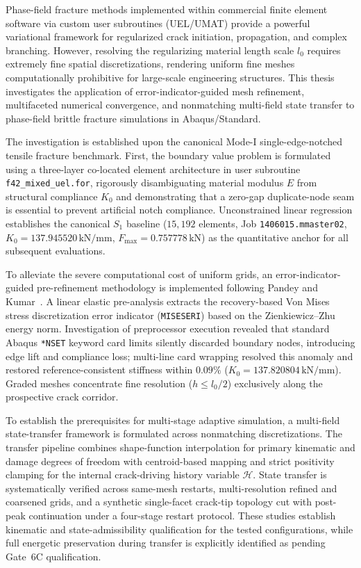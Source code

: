 Phase-field fracture methods implemented within commercial finite element software via custom user subroutines (UEL/UMAT) provide a powerful variational framework for regularized crack initiation, propagation, and complex branching. However, resolving the regularizing material length scale $l_0$ requires extremely fine spatial discretizations, rendering uniform fine meshes computationally prohibitive for large-scale engineering structures. This thesis investigates the application of error-indicator-guided mesh refinement, multifaceted numerical convergence, and nonmatching multi-field state transfer to phase-field brittle fracture simulations in Abaqus/Standard.

The investigation is established upon the canonical Mode-I single-edge-notched tensile fracture benchmark. First, the boundary value problem is formulated using a three-layer co-located element architecture in user subroutine \nolinkurl{f42_mixed_uel.for}, rigorously disambiguating material modulus $E$ from structural compliance $K_0$ and demonstrating that a zero-gap duplicate-node seam is essential to prevent artificial notch compliance. Unconstrained linear regression establishes the canonical $S_1$ baseline ($15{,}192$ elements, Job \texttt{1406015.mmaster02}, $K_0 = 137.945520\,\text{kN/mm}$, $F_{\max} = 0.757778\,\text{kN}$) as the quantitative anchor for all subsequent evaluations.

To alleviate the severe computational cost of uniform grids, an error-indicator-guided pre-refinement methodology is implemented following Pandey and Kumar~\cite{pandey2025}. A linear elastic pre-analysis extracts the recovery-based Von Mises stress discretization error indicator (\texttt{MISESERI}) based on the Zienkiewicz--Zhu energy norm. Investigation of preprocessor execution revealed that standard Abaqus \texttt{*NSET} keyword card limits silently discarded boundary nodes, introducing edge lift and compliance loss; multi-line card wrapping resolved this anomaly and restored reference-consistent stiffness within $0.09\%$ ($K_0 = 137.820804\,\text{kN/mm}$). Graded meshes concentrate fine resolution ($h \le l_0/2$) exclusively along the prospective crack corridor.

To establish the prerequisites for multi-stage adaptive simulation, a multi-field state-transfer framework is formulated across nonmatching discretizations. The transfer pipeline combines shape-function interpolation for primary kinematic and damage degrees of freedom with centroid-based mapping and strict positivity clamping for the internal crack-driving history variable $\mathcal{H}$. State transfer is systematically verified across same-mesh restarts, multi-resolution refined and coarsened grids, and a synthetic single-facet crack-tip topology cut with post-peak continuation under a four-stage restart protocol. These studies establish kinematic and state-admissibility qualification for the tested configurations, while full energetic preservation during transfer is explicitly identified as pending Gate~6C qualification.

